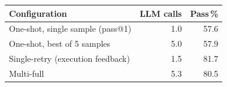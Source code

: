\begin{tabular}{@{}lrr@{}}
\toprule
Configuration & LLM calls & Pass\,\% \\
\midrule
One-shot, single sample (pass@1) & 1.0 & 57.6 \\
One-shot, best of 5 samples & 5.0 & 57.9 \\
Single-retry (execution feedback) & 1.5 & 81.7 \\
Multi-full & 5.3 & 80.5 \\
\bottomrule
\end{tabular}
